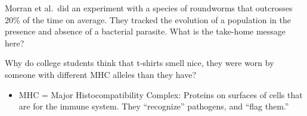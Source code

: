 \begin{frame}[t]
    \begin{adjustwidth}{-1.5em}{-1.5em}
        \vspace{-3mm}
        Morran et al.\ did an experiment with a species of roundworms that
        outcrosses 20\% of the time on average. They tracked the evolution of a
        population in the presence and absence of a bacterial parasite. What is
        the take-home message here?


        \vspace{-2mm}
    \end{adjustwidth}
\end{frame}

\begin{frame}[t]
    \begin{adjustwidth}{-1.5em}{-1.5em}
        Why do college students think that t-shirts smell nice, 
        they were worn by someone with different MHC alleles than they have?

        \begin{itemize}
            \item MHC = Major Histocompatibility Complex: Proteins on surfaces
                of cells that are  for the immune system.
                They ``recognize'' pathogens, and ``flag them.''
        \end{itemize}
    \end{adjustwidth}
\end{frame}



